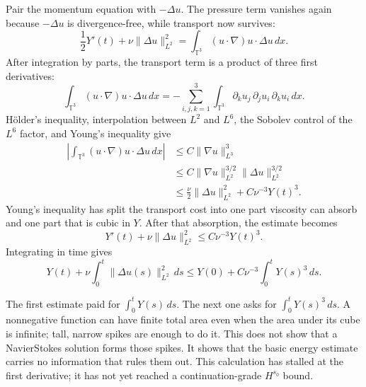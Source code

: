 Pair the momentum equation with \(-\Delta u\).
The pressure term vanishes again because \(-\Delta u\) is divergence-free, while transport now survives:
\[
  \frac12Y'(t)
  +
  \nu\lVert\Delta u\rVert_{L^2}^2
  =
  \int_{\mathbb T^3}(u\cdot\nabla)u\cdot\Delta u\,dx.
\]
After integration by parts, the transport term is a product of three first derivatives:
\[
  \int_{\mathbb T^3}(u\cdot\nabla)u\cdot\Delta u\,dx
  =
  -\sum_{i,j,k=1}^3
  \int_{\mathbb T^3}
  \partial_k u_j\,\partial_j u_i\,\partial_k u_i\,dx.
\]
Hölder's inequality, interpolation between \(L^2\) and \(L^6\), the Sobolev control of the \(L^6\) factor, and Young's inequality give
\[
  \begin{aligned}
  \left|
    \int_{\mathbb T^3}(u\cdot\nabla)u\cdot\Delta u\,dx
  \right|
  &\leq C\lVert\nabla u\rVert_{L^3}^3
  \\
  &\leq C\lVert\nabla u\rVert_{L^2}^{3/2}
           \lVert\Delta u\rVert_{L^2}^{3/2}
  \\
  &\leq \frac{\nu}{2}\lVert\Delta u\rVert_{L^2}^2
           +C\nu^{-3}Y(t)^3.
  \end{aligned}
\]
Young's inequality has split the transport cost into one part viscosity can absorb and one part that is cubic in \(Y\).
After that absorption, the estimate becomes
\[
  Y'(t)
  +
  \nu\lVert\Delta u\rVert_{L^2}^2
  \leq
  C\nu^{-3}Y(t)^3.
\]
Integrating in time gives
\[
  Y(t)
  +
  \nu\int_0^t\lVert\Delta u(s)\rVert_{L^2}^2\,ds
  \leq
  Y(0)
  +
  C\nu^{-3}\int_0^tY(s)^3\,ds.
\]

The first estimate paid for \(\int_0^tY(s)\,ds\).
The next one asks for \(\int_0^tY(s)^3\,ds\).
A nonnegative function can have finite total area even when the area under its cube is infinite; tall, narrow spikes are enough to do it.
This does not show that a Navier\textendash Stokes solution forms those spikes.
It shows that the basic energy estimate carries no information that rules them out.
This calculation has stalled at the first derivative; it has not yet reached a continuation-grade \(H^{s_0}\) bound.

